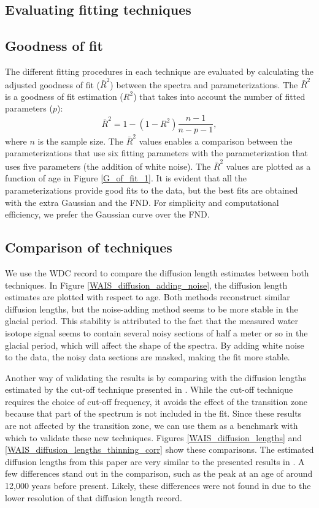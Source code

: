 \documentclass[draft, jgrga]{AGUTeX}
\begin{document}
\begin{article}
\section{Evaluating fitting techniques}
\subsection{Goodness of fit}
The different fitting procedures in each technique are evaluated by calculating the adjusted goodness of fit ($\bar{R}^2$) between the spectra and parameterizations. The $\bar{R}^2$ is a goodness of fit estimation ($R^2$) that takes into account the number of fitted parameters ($p$):
\begin{equation}
\bar{R}^2 = 1 - (1 -R^2) \frac{n - 1}{n - p - 1},
\end{equation}
where $n$ is the sample size.
The $\bar{R}^2$ values enables a comparison between the parameterizations that use six fitting parameters with the parameterization that uses five parameters (the addition of white noise). The $\bar{R}^2$ values are plotted as a function of age in Figure \ref{G_of_fit_1}. It is evident that all the parameterizations provide good fits to the data, but the best fits are obtained with the extra Gaussian and the FND. For simplicity and computational efficiency, we prefer the Gaussian curve over the FND.

\subsection{Comparison of techniques}
We use the WDC record to compare the diffusion length estimates between both techniques. In Figure \ref{WAIS_diffusion_adding_noise}, the diffusion length estimates are plotted with respect to age. Both methods reconstruct similar diffusion lengths, but the noise-adding method seems to be more stable in the glacial period. This stability is attributed to the fact that the measured water isotope signal seems to contain several noisy sections of half a meter or so in the glacial period, which will affect the shape of the spectra. By adding white noise to the data, the noisy data sections are masked, making the fit more stable.

Another way of validating the results is by comparing with the diffusion lengths estimated by the cut-off technique presented in \cite{Jones2017a}. While the cut-off technique requires the choice of cut-off frequency, it avoids the effect of the transition zone because that part of the spectrum is not included in the fit. Since these results are not affected by the transition zone, we can use them as a benchmark with which to validate these new techniques. Figures \ref{WAIS_diffusion_lengths} and \ref{WAIS_diffusion_lengths_thinning_corr} show these comparisons. The estimated diffusion lengths from this paper are very similar to the presented results in \cite{Jones2017a}. A few differences stand out in the comparison, such as the peak at an age of around 12,000 years before present. Likely, these differences were not found in \cite{Jones2017a} due
to the lower resolution of that diffusion length record.


\end{article}
\end{document}
